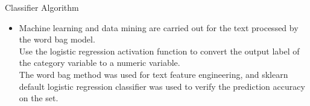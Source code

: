 \documentclass[
 size=14pt,
 paper=smartboard,  %
 mode=present, 		%
 display=slides, 	%
 style=tuliplab,  	%
 pauseslide,
 fleqn,leqno]{powerdot}
\begin{document}
\begin{slide}{Classifier Algorithm}
  \begin{itemize}
    \item  
    Machine learning and data mining are carried out for the text processed by the word bag model.
    \\Use the logistic regression activation function to convert the output label of the category variable to a numeric variable.
   \\ The word bag method was used for text feature engineering, and sklearn default logistic regression classifier was used to verify the prediction accuracy on the set.
  \end{itemize}
  
\end{slide}

  

\end{document}
